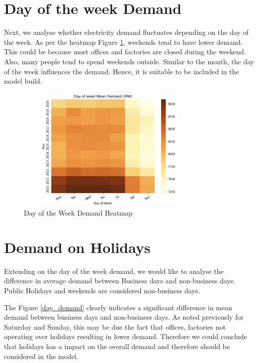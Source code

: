 \documentclass[mstat,12pt]{unswthesis}
\begin{document}
\hypertarget{day-of-the-week-demand}{%
\section{Day of the week Demand}\label{day-of-the-week-demand}}

Next, we analyse whether electricity demand fluctuates depending on the
day of the week. As per the heatmap Figure \ref{day_heat}, weekends tend
to have lower demand. This could be because most offices and factories
are closed during the weekend. Also, many people tend to spend weekends
outside. Similar to the month, the day of the week influences the
demand. Hence, it is suitable to be included in the model build.

\begin{figure}[H]
\centering
\includegraphics[width=0.80\textwidth,height=6cm]{day_heat.png}
\caption{Day of the Week Demand Heatmap}
\label{day_heat}
\end{figure}

\hypertarget{demand-on-holidays}{%
\section{Demand on Holidays}\label{demand-on-holidays}}

Extending on the day of the week demand, we would like to analyse the
difference in average demand between Business days and non-business
days. Public Holidays and weekends are considered non-business days.

The Figure \ref{day_demand} clearly indicates a significant difference
in mean demand between business days and non-business days. As noted
previously for Saturday and Sunday, this may be due the fact that
offices, factories not operating over holidays resulting in lower
demand. Therefore we could conclude that holidays has a impact on the
overall demand and therefore should be considered in the model.
\end{document}
